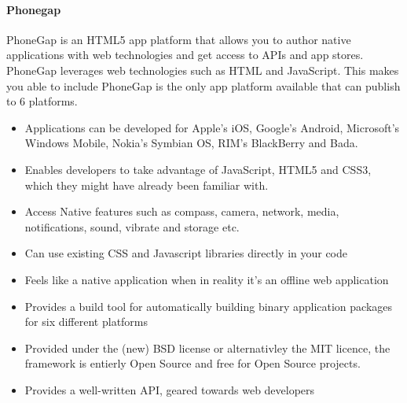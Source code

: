 \paragraph{Phonegap}
PhoneGap is an HTML5 app platform that allows you to author native applications with web technologies and get access to APIs and app stores. PhoneGap leverages web technologies such as HTML and JavaScript. This makes you able to include PhoneGap is the only app platform available that can publish to 6 platforms. 
\cite{phonegap:about}
	\begin{itemize}
		\item Applications can be developed for Apple’s iOS, Google’s Android,
		Microsoft’s Windows Mobile, Nokia’s Symbian OS, RIM’s BlackBerry and Bada.
		\item Enables developers to take advantage of JavaScript, HTML5 and CSS3,
		which they might have already been familiar with.
		\item Access Native features such as compass, camera, network, media,
		notifications, sound, vibrate and storage etc.
    \item Can use existing CSS and Javascript libraries directly in your code
    \item Feels like a native application when in reality it's an offline web application
    \item Provides a build tool for automatically building binary application packages for six different platforms
    \item Provided under the (new) BSD license or alternativley the MIT licence, the framework is entierly Open Source and free for Open Source projects.
    \item Provides a well-written API, geared towards web developers
	\end{itemize}
